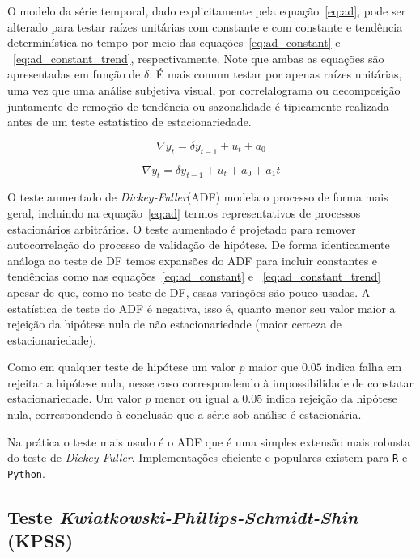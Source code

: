 O modelo da série temporal, dado explicitamente pela equação~\ref{eq:ad}, pode
ser alterado para testar raízes unitárias com constante e com constante e
tendência determinística no tempo por meio das equações~\ref{eq:ad_constant} e
~\ref{eq:ad_constant_trend}, respectivamente. Note que ambas as equações são
apresentadas em função de $\delta$. É mais comum testar por apenas raízes
unitárias, uma vez que uma análise subjetiva visual, por correlalograma ou
decomposição juntamente de remoção de tendência ou sazonalidade é tipicamente
realizada antes de um teste estatístico de estacionariedade.

\begin{equation}\label{eq:ad_constant}
    \nabla y_t = \delta y_{t-1} + u_t + a_0
\end{equation}

\begin{equation}\label{eq:ad_constant_trend}
    \nabla y_t = \delta y_{t-1} + u_t + a_0 + a_1 t
\end{equation}

O teste aumentado de \emph{Dickey-Fuller}(ADF) modela o processo de forma mais
geral, incluindo na equação~\ref{eq:ad} termos representativos de processos
estacionários arbitrários. O teste aumentado é projetado para remover
autocorrelação do processo de validação de hipótese. De forma identicamente
análoga ao teste de DF temos expansões do ADF para incluir constantes e
tendências como nas equações~\ref{eq:ad_constant} e
~\ref{eq:ad_constant_trend} apesar de que, como no teste de DF, essas
variações são pouco usadas. A estatística de teste do ADF é negativa, isso é,
quanto menor seu valor maior a rejeição da hipótese nula de não
estacionariedade (maior certeza de estacionariedade).

Como em qualquer teste de hipótese um valor $p$ maior que $0.05$ indica falha
em rejeitar a hipótese nula, nesse caso correspondendo à impossibilidade de
constatar estacionariedade. Um valor $p$ menor ou igual a $0.05$ indica
rejeição da hipótese nula, correspondendo à conclusão que a série sob análise
é estacionária.

Na prática o teste mais usado é o ADF que é uma simples extensão mais robusta
do teste de \emph{Dickey-Fuller}. Implementações eficiente e populares existem
para \verb+R+ e \verb+Python+.

\subsection{Teste \emph{Kwiatkowski-Phillips-Schmidt-Shin} (KPSS)}

